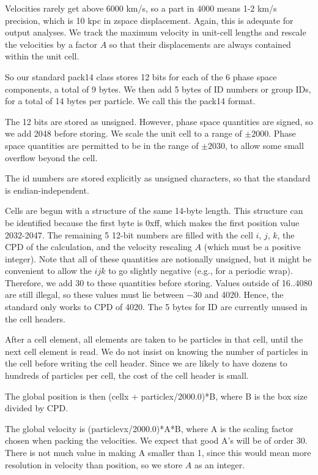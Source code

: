 \documentclass[11pt,preprint]{aastex}
\begin{document}
Velocities rarely get above 6000 km/s, so a part in 4000 means 1-2
km/s precision, which is 10 kpc in zspace displacement.  Again, this
is adequate for output analyses.  We track the maximum velocity 
in unit-cell lengths and rescale the velocities by a factor $A$ 
so that their displacements are always contained within the unit cell.

So our standard pack14 class stores 12 bits for each of the 6 phase
space components, a total of 9 bytes.  We then add 5 bytes of ID
numbers or group IDs, for a total of 14 bytes per particle.  We call
this the pack14 format.

The 12 bits are stored as unsigned.  However, phase space quantities
are signed, so we add 2048 before storing.  We scale the unit cell 
to a range of $\pm2000$.  Phase space quantities are permitted to 
be in the range of $\pm2030$, to allow some small overflow beyond 
the cell.

The id numbers are stored explicitly as unsigned characters, so
that the standard is endian-independent.

Cells are begun with a structure of the same 14-byte length.  This
structure can be identified because the first byte is 0xff, which
makes the first position value 2032-2047.  The remaining 5
12-bit numbers are filled with the cell $i$, $j$, $k$, the CPD 
of the calculation, and the velocity rescaling $A$ (which must be
a positive integer).  Note that all of these quantities are notionally
unsigned, but it might be convenient to allow the  $ijk$ to go slightly
negative (e.g., for a periodic wrap).  Therefore, we add 30 to these
quantities before storing.  Values outside of 16..4080 are still illegal, 
so these values must lie between $-30$ and 4020.  Hence, the standard
only works to CPD of 4020.  The 5 bytes for ID are currently unused
in the cell headers.

After a cell element, all elements are taken to be particles in
that cell, until the next cell element is read.  We do not insist
on knowing the number of particles in the cell before writing the
cell header.  Since we are likely to have dozens to hundreds of
particles per cell, the cost of the cell header is small.

The global position is then (cellx + particlex/2000.0)*B, where B
is the box size divided by CPD.  

The global velocity is (particlevx/2000.0)*A*B, where A is the
scaling factor chosen when packing the velocities.  We expect
that good A's will be of order 30.  There is not much value in 
making A smaller than 1, since this would mean more resolution 
in velocity than position, so we store $A$ as an integer. 
\end{document}

